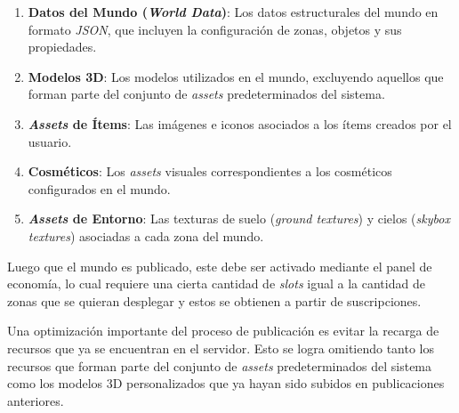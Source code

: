 \begin{enumerate}
  \item \textbf{Datos del Mundo (\textit{World Data})}: Los datos estructurales del mundo en formato \textit{JSON}, que incluyen la configuración
  de zonas, objetos y sus propiedades.
  \item \textbf{Modelos 3D}: Los modelos utilizados en el mundo, excluyendo aquellos que forman parte del
  conjunto de \textit{assets} predeterminados del sistema.
  \item \textbf{\textit{Assets} de Ítems}: Las imágenes e iconos asociados a los ítems creados por el usuario.
  \item \textbf{Cosméticos}: Los \textit{assets} visuales correspondientes a los cosméticos configurados en el mundo.
  \item \textbf{\textit{Assets} de Entorno}: Las texturas de suelo (\textit{ground textures}) y cielos
  (\textit{skybox textures}) asociadas a cada zona del mundo.
\end{enumerate}

Luego que el mundo es publicado, este debe ser activado mediante el panel de economía, lo cual requiere una cierta cantidad de \textit{slots}
igual a la cantidad de zonas que se quieran desplegar y estos se obtienen a partir de suscripciones.

\vspace{0.25cm}

Una optimización importante del proceso de publicación es evitar la recarga de recursos
que ya se encuentran en el servidor. Esto se logra omitiendo tanto los recursos que
forman parte del conjunto de \textit{assets} predeterminados del sistema como los modelos
3D personalizados que ya hayan sido subidos en publicaciones anteriores.
